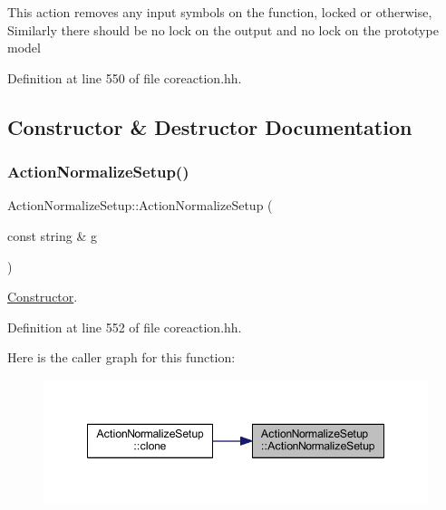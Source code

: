 This action removes any input symbols on the function, locked or otherwise, Similarly there should be no lock on the output and no lock on the prototype model 

Definition at line 550 of file coreaction.\+hh.



\subsection{Constructor \& Destructor Documentation}
\mbox{\label{class_action_normalize_setup_a40f859f0483d8e1f4f22046a44067d52}} 
\subsubsection{\texorpdfstring{ActionNormalizeSetup()}{ActionNormalizeSetup()}}
{\footnotesize\ttfamily Action\+Normalize\+Setup\+::\+Action\+Normalize\+Setup (\begin{DoxyParamCaption}\item[{const string \&}]{g }\end{DoxyParamCaption})\hspace{0.3cm}{\ttfamily [inline]}}



\mbox{\hyperlink{class_constructor}{Constructor}}. 



Definition at line 552 of file coreaction.\+hh.

Here is the caller graph for this function\+:
\nopagebreak
\begin{figure}[H]
\begin{center}
\leavevmode
\includegraphics[width=348pt]{class_action_normalize_setup_a40f859f0483d8e1f4f22046a44067d52_icgraph}
\end{center}
\end{figure}


